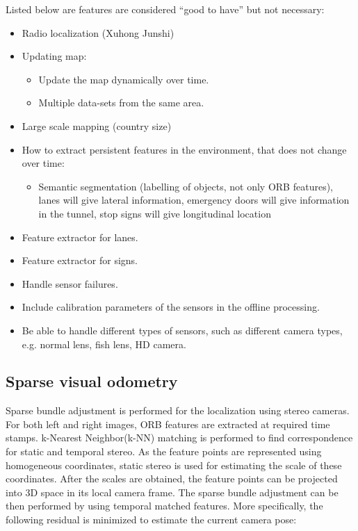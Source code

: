 Listed below are features are considered ``good to have'' but not
necessary:

\begin{itemize}
\item Radio localization  (Xuhong  Junshi)
\item Updating map:
  \begin{itemize}
  \item Update the map dynamically over time.
  \item Multiple data-sets from the same area.
  \end{itemize}
\item Large scale mapping (country size)
\item How to extract persistent features in the environment, that does
  not change over time:
  \begin{itemize}
  \item  Semantic segmentation (labelling of objects, not only ORB
    features), lanes will give lateral information, emergency doors
    will give information in the tunnel, stop signs will give
    longitudinal location
  \end{itemize}
\item Feature extractor for lanes.
\item Feature extractor for signs.
\item Handle sensor failures.
\item Include calibration parameters of the sensors in the offline processing.
\item Be able to handle different types of sensors, such as different camera types, e.g. normal lens, fish lens, HD camera.
\end{itemize}

\subsection{Sparse visual odometry}

 Sparse bundle adjustment is performed for the localization using stereo cameras. For both left and right images, ORB features are extracted at required time stamps. k-Nearest Neighbor(k-NN) matching is performed to find correspondence for static and temporal stereo. As the feature points are represented using homogeneous coordinates, static stereo is used for estimating the scale of these coordinates. After the scales are obtained, the feature points can be projected into 3D space in its local camera frame. The sparse bundle adjustment can be then performed by using temporal matched features. More specifically, the following residual is minimized to estimate the current camera pose:

